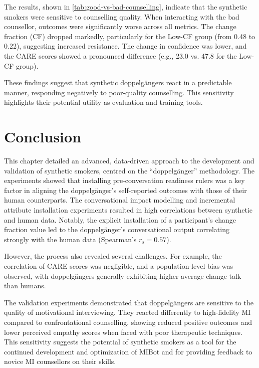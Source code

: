 The results, shown in \cref{tab:good-vs-bad-counselling}, indicate that the synthetic smokers were sensitive to counselling quality. When interacting with the bad counsellor, outcomes were significantly worse across all metrics. The change fraction (CF) dropped markedly, particularly for the Low-CF group (from 0.48 to 0.22), suggesting increased resistance. The change in confidence was lower, and the CARE scores showed a pronounced difference (e.g., 23.0 vs. 47.8 for the Low-CF group).

These findings suggest that synthetic doppelgängers react in a predictable manner, responding negatively to poor-quality counselling. This sensitivity highlights their potential utility as evaluation and training tools.

\section{Conclusion}

This chapter detailed an advanced, data-driven approach to the development and validation of synthetic smokers, centred on the ``doppelgänger'' methodology. The experiments showed that installing pre-conversation readiness rulers was a key factor in aligning the doppelgänger's self-reported outcomes with those of their human counterparts. The conversational impact modelling and incremental attribute installation experiments resulted in high correlations between synthetic and human data. Notably, the explicit installation of a participant's change fraction value led to the doppelgänger's conversational output correlating strongly with the human data (Spearman's $r_s = 0.57$).

However, the process also revealed several challenges. For example, the correlation of CARE scores was negligible, and a population-level bias was observed, with doppelgängers generally exhibiting higher average change talk than humans.

The validation experiments demonstrated that doppelgängers are sensitive to the quality of motivational interviewing. They reacted differently to high-fidelity MI compared to confrontational counselling, showing reduced positive outcomes and lower perceived empathy scores when faced with poor therapeutic techniques. This sensitivity suggests the potential of synthetic smokers as a tool for the continued development and optimization of MIBot and for providing feedback to novice MI counsellors on their skills.